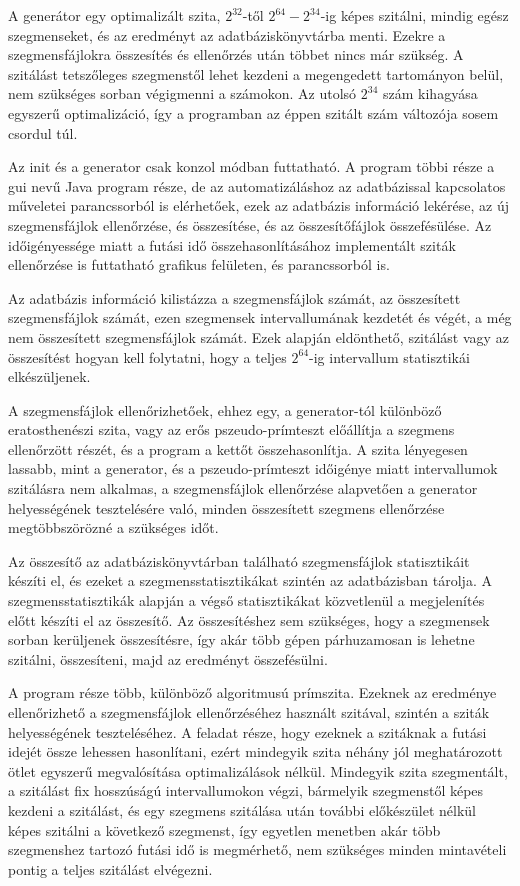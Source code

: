 A generátor egy optimalizált szita, $2^{32}$-től $2^{64}-2^{34}$-ig képes szitálni,
mindig egész szegmenseket, és az eredményt az adatbáziskönyvtárba menti.
Ezekre a szegmensfájlokra összesítés és ellenőrzés után többet nincs már szükség.
A szitálást tetszőleges szegmenstől lehet kezdeni a megengedett tartományon belül,
nem szükséges sorban végigmenni a számokon.
Az utolsó $2^{34}$ szám kihagyása egyszerű
optimalizáció, így a programban az éppen
szitált szám változója sosem csordul túl.

Az init és a generator csak konzol módban futtatható.
A program többi része a gui nevű Java program része,
de az automatizáláshoz az adatbázissal kapcsolatos műveletei
parancssorból is elérhetőek, ezek az adatbázis információ lekérése, az új szegmensfájlok ellenőrzése, és összesítése, és az összesítőfájlok összefésülése.
Az időigényessége miatt a futási idő összehasonlításához implementált sziták ellenőrzése is futtatható grafikus felületen, és parancssorból is.

Az adatbázis információ kilistázza a szegmensfájlok számát,
az összesített szegmensfájlok számát, ezen szegmensek intervallumának kezdetét és végét, a még nem összesített szegmensfájlok számát.
Ezek alapján eldönthető, szitálást vagy az összesítést hogyan kell folytatni, hogy a teljes $2^{64}$-ig intervallum statisztikái elkészüljenek.

A szegmensfájlok ellenőrizhetőek, ehhez egy, a generator-tól különböző eratosthenészi szita, vagy az erős pszeudo-prímteszt előállítja a szegmens ellenőrzött részét, és a program a kettőt összehasonlítja.
A szita lényegesen lassabb, mint a generator, és a pszeudo-prímteszt időigénye miatt intervallumok szitálásra nem alkalmas, a szegmensfájlok ellenőrzése alapvetően a generator helyességének
tesztelésére való, minden összesített szegmens ellenőrzése megtöbbszörözné a szükséges időt.

Az összesítő az adatbáziskönyvtárban található szegmensfájlok statisztikáit készíti el, és ezeket a szegmensstatisztikákat szintén az adatbázisban tárolja.
A szegmensstatisztikák alapján a végső statisztikákat közvetlenül a megjelenítés előtt készíti el az összesítő.
Az összesítéshez sem szükséges, hogy a szegmensek sorban kerüljenek összesítésre, így akár több gépen párhuzamosan is lehetne szitálni, összesíteni, majd az eredményt összefésülni.

A program része több, különböző algoritmusú prímszita.
Ezeknek az eredménye ellenőrizhető a szegmensfájlok ellenőrzéséhez használt szitával, szintén a sziták helyességének teszteléséhez.
A feladat része, hogy ezeknek a szitáknak a futási idejét össze lehessen hasonlítani, ezért mindegyik szita néhány jól meghatározott ötlet egyszerű megvalósítása optimalizálások nélkül.
Mindegyik szita szegmentált, a szitálást fix hosszúságú intervallumokon végzi, bármelyik szegmenstől képes kezdeni a szitálást, és egy szegmens szitálása után további előkészület nélkül képes szitálni a következő szegmenst, így egyetlen menetben akár több szegmenshez tartozó futási idő is megmérhető, nem szükséges minden mintavételi pontig a teljes szitálást elvégezni.

